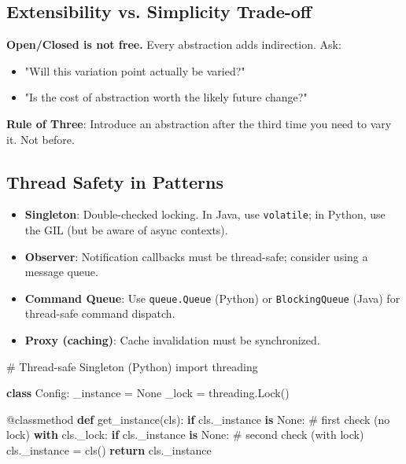 \documentclass[11pt]{article}
\providecommand{\tightlist}{\setlength{\itemsep}{1pt}\setlength{\parskip}{0pt}}
\newenvironment{Shaded}{\begin{snugshade}}{\end{snugshade}}
\newcommand{\AttributeTok}[1]{\textcolor[rgb]{0.16,0.50,0.73}{#1}}
\newcommand{\CommentTok}[1]{\textcolor[rgb]{0.48,0.49,0.49}{#1}}
\newcommand{\ControlFlowTok}[1]{\textcolor[rgb]{0.99,0.74,0.29}{\textbf{#1}}}
\newcommand{\ImportTok}[1]{\textcolor[rgb]{0.15,0.68,0.38}{#1}}
\newcommand{\KeywordTok}[1]{\textcolor[rgb]{0.81,0.81,0.76}{\textbf{#1}}}
\newcommand{\NormalTok}[1]{\textcolor[rgb]{0.81,0.81,0.76}{#1}}
\newcommand{\OperatorTok}[1]{\textcolor[rgb]{0.81,0.81,0.76}{#1}}
\newcommand{\VariableTok}[1]{\textcolor[rgb]{0.15,0.68,0.68}{#1}}
\begin{document}
\subsection{Extensibility vs. Simplicity Trade-off}\label{extensibility-vs-simplicity-trade-off}

\textbf{Open/Closed is not free.} Every abstraction adds indirection. Ask:

\begin{itemize}
\tightlist
\item
  "Will this variation point actually be varied?"
\item
  "Is the cost of abstraction worth the likely future change?"
\end{itemize}

\textbf{Rule of Three}: Introduce an abstraction after the third time you need to vary it. Not before.

\subsection{Thread Safety in Patterns}\label{thread-safety-in-patterns}

\begin{itemize}
\tightlist
\item
  \textbf{Singleton}: Double-checked locking. In Java, use \texttt{volatile}; in Python, use the GIL (but be aware of async contexts).
\item
  \textbf{Observer}: Notification callbacks must be thread-safe; consider using a message queue.
\item
  \textbf{Command Queue}: Use \texttt{queue.Queue} (Python) or \texttt{BlockingQueue} (Java) for thread-safe command dispatch.
\item
  \textbf{Proxy (caching)}: Cache invalidation must be synchronized.
\end{itemize}


\begin{Shaded}
\begin{Highlighting}[]
\CommentTok{\# Thread{-}safe Singleton (Python)}
\ImportTok{import}\NormalTok{ threading}

\KeywordTok{class}\NormalTok{ Config:}
\NormalTok{    \_instance }\OperatorTok{=} \VariableTok{None}
\NormalTok{    \_lock }\OperatorTok{=}\NormalTok{ threading.Lock()}

    \AttributeTok{@classmethod}
    \KeywordTok{def}\NormalTok{ get\_instance(cls):}
        \ControlFlowTok{if}\NormalTok{ cls.\_instance }\KeywordTok{is} \VariableTok{None}\NormalTok{:          }\CommentTok{\# first check (no lock)}
            \ControlFlowTok{with}\NormalTok{ cls.\_lock:}
                \ControlFlowTok{if}\NormalTok{ cls.\_instance }\KeywordTok{is} \VariableTok{None}\NormalTok{:  }\CommentTok{\# second check (with lock)}
\NormalTok{                    cls.\_instance }\OperatorTok{=}\NormalTok{ cls()}
        \ControlFlowTok{return}\NormalTok{ cls.\_instance}
\end{Highlighting}
\end{Shaded}
\end{document}
